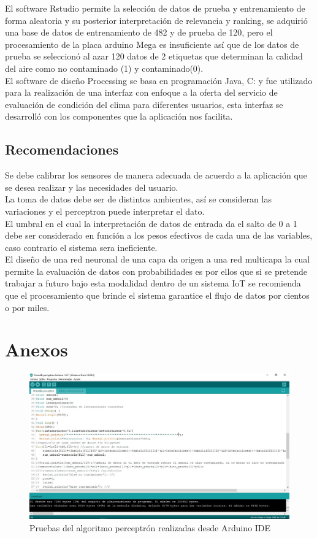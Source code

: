 \documentclass[10pt,a4paper]{article}
\begin{document}
El software Rstudio permite la selección de datos de prueba y entrenamiento de forma aleatoria y su posterior interpretación de relevancia y ranking, se adquirió una base de datos de entrenamiento de 482 y de prueba de 120, pero el procesamiento de la placa arduino Mega es insuficiente así que de los datos de prueba se seleccionó al azar 120 datos de 2 etiquetas que determinan la calidad del aire como no contaminado (1) y contaminado(0).\\

El software de diseño Processing se basa en programación Java, C: y fue utilizado para la realización de una interfaz con enfoque a la oferta del servicio de evaluación de condición del clima para diferentes usuarios, esta interfaz se desarrolló con los componentes que la aplicación nos facilita.\\


\subsection{Recomendaciones}

Se debe calibrar los sensores de manera adecuada de acuerdo a la aplicación que se desea realizar y las necesidades del usuario.\\

La toma de datos debe ser de distintos ambientes, así se consideran las variaciones y el perceptron puede interpretar el dato. \\

El umbral en el cual la interpretación de datos de entrada da el salto de 0 a 1 debe ser considerado en función a los pesos efectivos de cada una de las variables, caso contrario el sistema sera ineficiente.\\ 

El diseño de una red neuronal de una capa da origen a una red multicapa la cual permite la evaluación de datos con probabilidades es por ellos que si se pretende trabajar a futuro bajo esta modalidad dentro de un sistema IoT se recomienda que el procesamiento que brinde el sistema garantice el flujo de datos por cientos o por miles.\\

\section{Anexos}

\begin{figure}[H]
\centering
\includegraphics[scale=0.50]{pruebas.JPG}
\caption{Pruebas del algoritmo perceptrón realizadas desde Arduino IDE} 
\end{figure}
\end{document}
